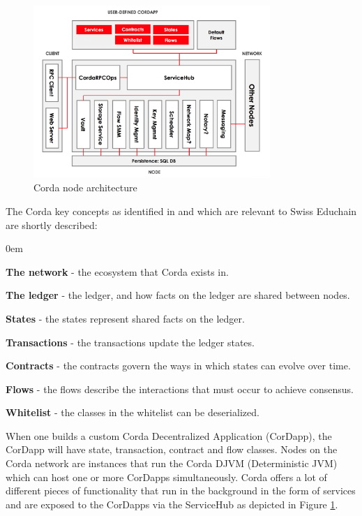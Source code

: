 \begin{figure}[H]
	\centering
	\captionsetup{width=.8\linewidth}
	\includegraphics[width=0.8\textwidth]{figs/ch3/node-architecture}
	\caption{Corda node architecture \cite{corda-nodes}}
	\label{fig:node-architecture}
\end{figure} 


The Corda key concepts as identified in \cite{corda-concepts} and which are relevant to Swiss Educhain are shortly described:  
\begin{description}
	\itemsep0em
	\item\textbf{The network} - the ecosystem that Corda exists in.
	\item\textbf{The ledger} - the ledger, and how facts on the ledger are shared between nodes.
	\item\textbf{States} - the states represent shared facts on the ledger.
	\item\textbf{Transactions} - the transactions update the ledger states.
	\item\textbf{Contracts} - the contracts govern the ways in which states can evolve over time.
	\item\textbf{Flows}	- the flows describe the interactions that must occur to achieve consensus.
	\item\textbf{Whitelist} - the classes in the whitelist can be deserialized.
\end{description}

When one builds a custom Corda Decentralized Application (CorDapp), the CorDapp will have state, transaction, contract and flow classes. Nodes on the Corda network are instances that run the Corda DJVM (Deterministic JVM) \cite{corda-djvm} which can host one or more CorDapps simultaneously. Corda offers a lot of different pieces of functionality that run in the background in the form of services and are exposed to the CorDapps via the ServiceHub as depicted in Figure \ref{fig:node-architecture}.

